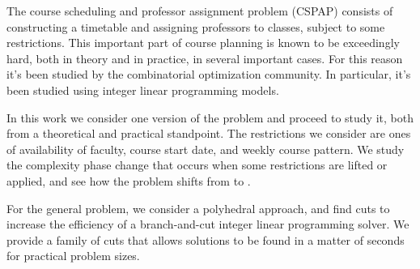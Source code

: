 The course scheduling and professor assignment problem (CSPAP) consists of constructing a timetable and assigning professors to classes, subject to some restrictions. This important part of course planning is known to be exceedingly hard, both in theory and in practice, in several important cases. For this reason it's been studied by the combinatorial optimization community. In particular, it's been studied using integer linear programming models.

In this work we consider one version of the problem and proceed to study it, both from a theoretical and practical standpoint. The restrictions we consider are ones of availability of faculty, course start date, and weekly course pattern. We study the complexity phase change that occurs when some restrictions are lifted or applied, and see how the problem shifts from \p to \npc.

For the general problem, we consider a polyhedral approach, and find cuts to increase the efficiency of a branch-and-cut integer linear programming solver. We provide a family of cuts that allows solutions to be found in a matter of seconds for practical problem sizes.
